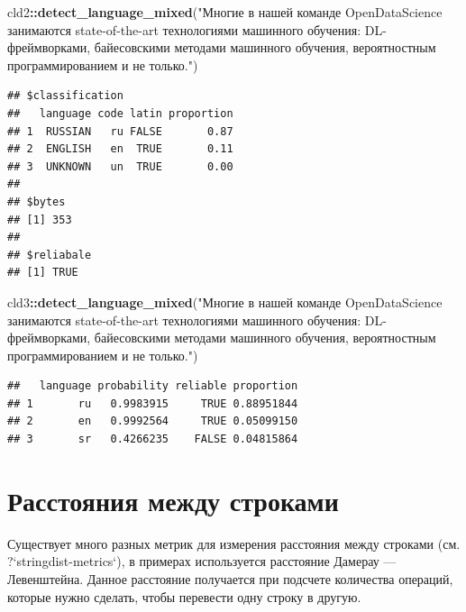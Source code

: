 \documentclass[
]{book}
\newenvironment{Shaded}{\begin{snugshade}}{\end{snugshade}}
\newcommand{\KeywordTok}[1]{\textcolor[rgb]{0.13,0.29,0.53}{\textbf{#1}}}
\newcommand{\NormalTok}[1]{#1}
\newcommand{\OperatorTok}[1]{\textcolor[rgb]{0.81,0.36,0.00}{\textbf{#1}}}
\newcommand{\StringTok}[1]{\textcolor[rgb]{0.31,0.60,0.02}{#1}}
\begin{document}
\begin{Shaded}
\begin{Highlighting}[]
\NormalTok{cld2}\OperatorTok{::}\KeywordTok{detect_language_mixed}\NormalTok{(}\StringTok{"Многие в нашей команде OpenDataScience занимаются state-of-the-art технологиями машинного обучения: DL-фреймворками, байесовскими методами машинного обучения, вероятностным программированием и не только."}\NormalTok{)}
\end{Highlighting}
\end{Shaded}

\begin{verbatim}
## $classification
##   language code latin proportion
## 1  RUSSIAN   ru FALSE       0.87
## 2  ENGLISH   en  TRUE       0.11
## 3  UNKNOWN   un  TRUE       0.00
## 
## $bytes
## [1] 353
## 
## $reliabale
## [1] TRUE
\end{verbatim}

\begin{Shaded}
\begin{Highlighting}[]
\NormalTok{cld3}\OperatorTok{::}\KeywordTok{detect_language_mixed}\NormalTok{(}\StringTok{"Многие в нашей команде OpenDataScience занимаются state-of-the-art технологиями машинного обучения: DL-фреймворками, байесовскими методами машинного обучения, вероятностным программированием и не только."}\NormalTok{)}
\end{Highlighting}
\end{Shaded}

\begin{verbatim}
##   language probability reliable proportion
## 1       ru   0.9983915     TRUE 0.88951844
## 2       en   0.9992564     TRUE 0.05099150
## 3       sr   0.4266235    FALSE 0.04815864
\end{verbatim}

\hypertarget{ux440ux430ux441ux441ux442ux43eux44fux43dux438ux44f-ux43cux435ux436ux434ux443-ux441ux442ux440ux43eux43aux430ux43cux438}{%
\section{Расстояния между строками}\label{ux440ux430ux441ux441ux442ux43eux44fux43dux438ux44f-ux43cux435ux436ux434ux443-ux441ux442ux440ux43eux43aux430ux43cux438}}

Существует много разных метрик для измерения расстояния между строками (см. ?{}`stringdist-metrics`), в примерах используется расстояние Дамерау --- Левенштейна. Данное расстояние получается при подсчете количества операций, которые нужно сделать, чтобы перевести одну строку в другую.
\end{document}
